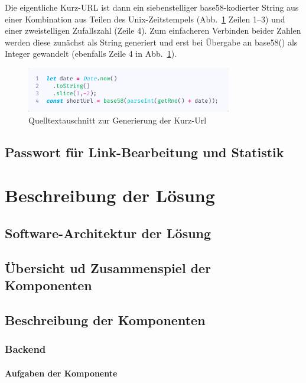 \documentclass[a4paper,11pt,DIV=12,overfullrule=on]{scrreprt}
\begin{document}
Die eigentliche Kurz-URL ist dann ein siebenstelliger base58-kodierter String aus einer Kombination aus Teilen des Unix-Zeitstempels (Abb.~\ref{fig:261shorturl} Zeilen 1–3) und einer zweistelligen Zufallszahl (Zeile 4). Zum einfacheren Verbinden beider Zahlen werden diese zunächst als String generiert und erst bei Übergabe an {\ttfamily base58()} als Integer gewandelt (ebenfalls Zeile 4 in Abb.~\ref{fig:261shorturl}).
\begin{figure}%
    \begin{small}%
        \begin{center}%
            \includegraphics[width=0.8\textwidth]{2_6_1_shortUrl.png}%
        \end{center}%
        \caption{Quelltextauschnitt zur Generierung der Kurz-Url}%
        \label{fig:261shorturl}%
    \end{small}%
\end{figure}%


\section{Passwort für Link-Bearbeitung und Statistik}


\chapter{Beschreibung der Lösung}
\section{Software-Architektur der Lösung}
\section{Übersicht ud Zusammenspiel der Komponenten}
\section{Beschreibung der Komponenten}
\subsection{Backend}
\subsubsection{Aufgaben der Komponente}
\end{document}
